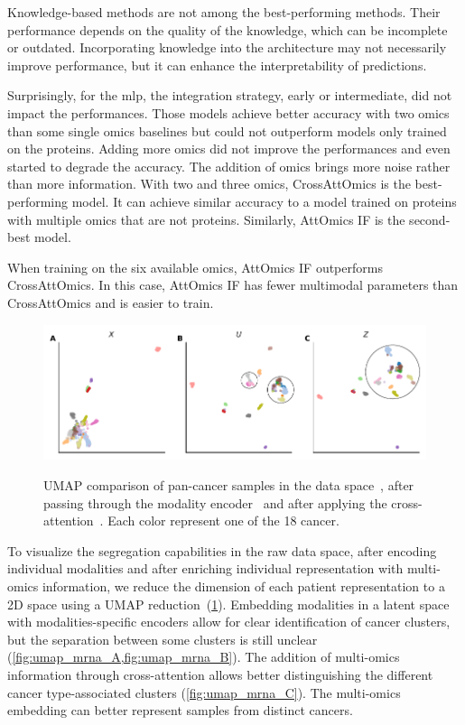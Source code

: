 \documentclass[../main.tex]{subfiles}
\begin{document}
		Knowledge-based methods are not among the best-performing methods.
		Their performance depends on the quality of the knowledge, which can be incomplete or outdated.
		Incorporating knowledge into the architecture may not necessarily improve performance, but it can enhance the interpretability of predictions.

		Surprisingly, for the \gls{mlp}, the integration strategy, early or intermediate, did not impact the performances.
		Those models achieve better accuracy with two omics than some single omics baselines but could not outperform models only trained on the proteins.
		Adding more omics did not improve the performances and even started to degrade the accuracy.
		The addition of omics brings more noise rather than more information.
		With two and three omics, CrossAttOmics is the best-performing model.
		It can achieve similar accuracy to a model trained on proteins with multiple omics that are not proteins.
		Similarly, AttOmics IF is the second-best model.

		When training on the six available omics, AttOmics IF outperforms CrossAttOmics.
		In this case, AttOmics IF has fewer multimodal parameters than CrossAttOmics and is easier to train.

		\begin{figure}
			\centering
			\begin{subcaptiongroup}
				\includegraphics{umap_mRNA.pdf}
				\label{fig:umap_mrna_A}
				\label{fig:umap_mrna_B}
				\label{fig:umap_mrna_C}
			\end{subcaptiongroup}
			\caption[UMAP comparison of pan-cancer samples]{UMAP comparison of pan-cancer samples in the data space~, after passing through the modality encoder~ and after applying the cross-attention~. Each color represent one of the 18 cancer. }
			\label{fig:umap_mrna}
		\end{figure}

		To visualize the segregation capabilities in the raw data space, after encoding individual modalities and after enriching individual representation with multi-omics information, we reduce the dimension of each patient representation to a 2D space using a UMAP reduction~(\cref{fig:umap_mrna}).
		Embedding modalities in a latent space with modalities-specific encoders allow for clear identification of cancer clusters, but the separation between some clusters is still unclear (\cref{fig:umap_mrna_A,fig:umap_mrna_B}).
		The addition of multi-omics information through cross-attention allows better distinguishing the different cancer type-associated clusters (\cref{fig:umap_mrna_C}).
		The multi-omics embedding can better represent samples from distinct cancers.
\end{document}
